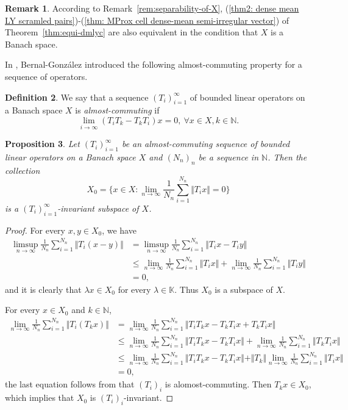 \documentclass[12pt,a4paper]{amsart}
\theoremstyle{definition}
\newtheorem{defn}{Definition}[section]
\newtheorem{rem}[defn]{Remark}
\theoremstyle{plain}
\newtheorem{prop}[defn]{Proposition}
\begin{document}
\begin{rem}\label{rem:separability-of-X-2}
According to Remark~\ref{rem:separability-of-X},
(\ref{thm2: dense mean LY scramled pairs})-(\ref{thm: MProx cell dense-mean semi-irregular vector}) of Theorem~\ref{thm:equi-dmlyc}
are also equivalent in the condition that $X$ is a Banach space.
\end{rem}

In \cite{B2000}, Bernal-Gonz\'{a}lez introduced the following almost-commuting property for a sequence of operators.

\begin{defn}
    We say that a sequence $(T_i)_{i=1}^\infty$ of bounded linear operators on a Banach space $X$ is \emph{almost-commuting} if
    \[
        \lim_{i\to\infty} (T_iT_k-T_kT_i)x=0, \ \forall x\in X, k\in\mathbb{N}.
    \]
\end{defn}

\begin{prop}\label{prop:inv}
    Let $(T_i)_{i=1}^\infty$ be an almost-commuting sequence of bounded linear operators on a Banach space $X$ and $(N_n)_n$ be a sequence in $\mathbb{N}$.
    Then the collection
    \[
        X_0= \biggl\{x\in X\colon \lim_{n\to\infty}\frac{1}{N_n}\sum_{i=1}^{N_n}\Vert T_i x\Vert =0\biggr\}
    \]
    is a $(T_i)_{i=1}^\infty$-invariant subspace of $X$.
\end{prop}
\begin{proof}
    For every $x, y\in X_0$, we have
    \begin{align*}
        \limsup_{n\to \infty} \frac{1}{N_n}\sum_{i=1}^{N_n} \Vert T_i (x-y) \Vert & =\limsup_{n\to \infty} \frac{1}{N_n}\sum_{i=1}^{N_n} \Vert T_i x-T_iy \Vert   \\
        & \le \lim_{n\to \infty} \frac{1}{N_n}\sum_{i=1}^{N_n} \Vert T_i x \Vert+\lim_{n\to \infty} \frac{1}{N_n}\sum_{i=1}^{N_n} \Vert T_iy  \Vert \\
        & =0,
    \end{align*}
    and it is clearly that $\lambda x\in X_0$ for every $\lambda \in \mathbb{K}$.
    Thus $X_0$ is a subspace of $X$.

    For every $x\in X_0$ and $k\in \mathbb{N}$,
    \begin{align*}
        \lim_{n\to \infty} \frac{1}{N_n}\sum_{i=1}^{N_n} \Vert T_i (T_kx) \Vert & =\lim_{n\to \infty} \frac{1}{N_n}\sum_{i=1}^{N_n} \Vert T_iT_kx-T_kT_ix+ T_kT_ix\Vert \\
      & \le \lim_{n\to \infty} \frac{1}{N_n}\sum_{i=1}^{N_n} \Vert T_iT_kx-T_kT_ix \Vert+\lim_{n\to \infty} \frac{1}{N_n}\sum_{i=1}^{N_n} \Vert T_kT_ix \Vert  \\
      & \le \lim_{n\to \infty} \frac{1}{N_n}\sum_{i=1}^{N_n} \Vert T_iT_kx-T_kT_ix \Vert+ \Vert T_k \Vert  \lim_{n\to \infty} \frac{1}{N_n}\sum_{i=1}^{N_n} \Vert  T_ix \Vert \\
       & =0,
    \end{align*}
    the last equation follows from that $(T_i)_i$ is alomost-commuting.
    Then $T_kx\in X_0$, which implies that $X_0$ is $(T_i)_{i}$-invariant.
\end{proof}
\end{document}
